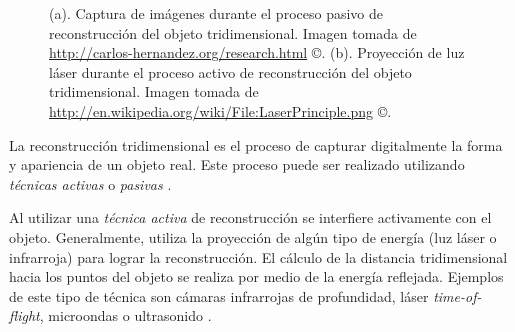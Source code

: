 \begin{figure}[H]
\centering
{}                
\caption[Reconstrucci\'{o}n pasiva vs activa de un objeto tridimensional]%
{(a). Captura de im\'{a}genes durante el proceso pasivo de reconstrucci\'{o}n del objeto tridimensional. Imagen tomada de \url{http://carlos-hernandez.org/research.html} \copyright. (b). Proyecci\'{o}n de luz l\'{a}ser durante el proceso activo de re\-cons\-truc\-ci\'{o}n del objeto tridimensional. Imagen tomada de \url{http://en.wikipedia.org/wiki/File:LaserPrinciple.png} \copyright.}
\label{fig:3DReconstruction}
\end{figure}

La reconstrucci\'{o}n tridimensional es el proceso de capturar digitalmente la forma y apariencia de un objeto real. Este proceso puede ser realizado utilizando \emph{t\'{e}cnicas activas} o \emph{pasivas} \cite{Szeliski_2010,Forsyth_Ponce_2002,Cyganek_Siebert_2009}.

Al utilizar una \emph{t\'{e}cnica activa} de reconstrucci\'{o}n se interfiere activamente con el objeto. Generalmente, utiliza la proyecci\'{o}n de alg\'{u}n tipo de energ\'{i}a (luz l\'{a}ser o in\-fra\-rro\-ja) para lograr la reconstrucci\'{o}n. El c\'{a}lculo de la distancia tridimensional hacia los puntos del objeto se realiza por medio de la energ\'{i}a reflejada. Ejemplos de este tipo de t\'{e}cnica son c\'{a}maras in\-fra\-rro\-jas de profundidad, l\'{a}ser \emph{time-of-flight}, microondas o ultrasonido \cite{Rocchini_Cignoni_Montani_Pingi_Scopigno_2001,wiki:Janus_machine,Smisek_Jancosek_Pajdla_2011}. 

